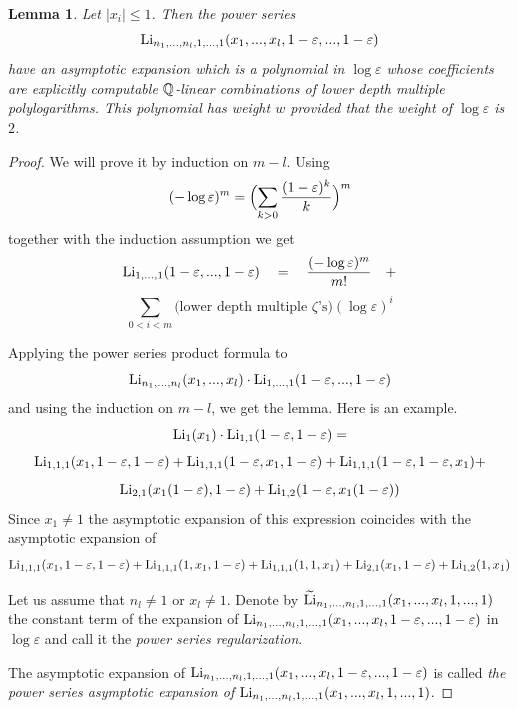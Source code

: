 \documentclass[10pt]{article}
\newtheorem{lemma}[theorem]{Lemma}
\begin{document}
\begin{lemma} \label{olmn}
Let $|x_i | \leq 1 $. Then the power series
\begin{equation}  \label{ol1}
{\rm Li}_{n_1,...,n_l,1, ...,1}(x_1,...,x_l, 1- \varepsilon, ... , 1- \varepsilon)
\end{equation} 
have  an asymptotic expansion which is a polynomial in $  \log
\varepsilon $ whose coefficients are explicitly computable  ${\mathbb Q}$-linear combinations of lower depth multiple polylogarithms. This polynomial has weight $w$ provided that the weight of 
$  \log \varepsilon $ is $2$. 
\end{lemma}

 
 \begin{proof}   We will prove it by  induction on $m-l$. Using   
$$
(- \log \varepsilon)^m  = \Bigl(\sum_{k>0}\frac{(1- \varepsilon)^k}{k}\Bigr)^m  
$$  
together with the induction assumption we get      
$$
{\rm Li}_{ 1, ...,1}(  1- \varepsilon, ... , 1- \varepsilon) \quad = \quad
\frac{(- \log \varepsilon)^m }{m!} \quad + 
$$
\begin{equation} \label{req212}
\sum_{0<i<m}\mbox{(lower depth multiple $\zeta$'s)} (\log \varepsilon)^i
\end{equation} 
   
 Applying   the 
 power series product formula to
 $$ 
 {\rm Li}_{n_1,...,n_l }(x_1,...,x_l) \cdot  
  {\rm Li}_{ 1, ...,1}(  1- \varepsilon, ... , 1- \varepsilon) 
 $$
 and using the induction  on $m-l$, we get the lemma. 
Here is an example. 
$$
{\rm Li}_1(x_1) \cdot {\rm Li}_{ 1, 1}(  1- \varepsilon, 1- \varepsilon) = 
$$
$$
{\rm Li}_{ 1, 1, 1}(  x_1, 1- \varepsilon, 1- \varepsilon) + {\rm Li}_{ 1, 1, 1}(  1- \varepsilon, x_1, 1- \varepsilon) + {\rm Li}_{ 1, 1, 1}(  1- \varepsilon, 1- \varepsilon,  x_1) + 
$$
$$
{\rm Li}_{ 2, 1}(  x_1(1- \varepsilon), 1- \varepsilon) + {\rm Li}_{ 1,2}(1- \varepsilon,   x_1(1- \varepsilon)) 
$$
Since $x_1 \not = 1$ the asymptotic expansion of this expression coincides with the asymptotic expansion of 
$$
{\rm Li}_{ 1, 1, 1}(  x_1, 1- \varepsilon, 1- \varepsilon) + {\rm Li}_{ 1, 1, 1}(  1, x_1, 1- \varepsilon) + 
{\rm Li}_{ 1, 1, 1}(  1, 1,  x_1) + {\rm Li}_{ 2, 1}(  x_1, 1- \varepsilon) + {\rm Li}_{ 1,2}(1,   x_1) 
$$

    
Let us assume that $n_l \not = 1$ or $x_l \not = 1$. 
Denote by ${\widetilde {\rm {\rm Li}}}_{n_1,...,n_l,1, ...,1}(x_1,...,x_l, 1, ... , 1)$ 
the constant term of the expansion 
of ${\rm Li}_{n_1,...,n_l,1, ...,1}(x_1,...,x_l, 1- \varepsilon, ... , 1- \varepsilon)$ 
in $\log \varepsilon$ and call it 
the {\it power series regularization}. 

The asymptotic expansion of 
${\rm Li}_{n_1,...,n_l,1, ...,1}(x_1,...,x_l, 1 - \varepsilon, ... , 1- \varepsilon)$ is called
{\it the power series asymptotic expansion of}
${\rm Li}_{n_1,...,n_l,1, ...,1}(x_1,...,x_l, 1, ... , 1)$. 


\end{proof}
\end{document}

